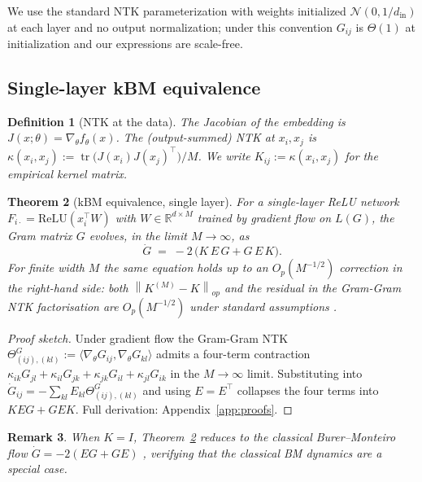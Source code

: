 \documentclass{article}
\newtheorem{theorem}{Theorem}
\newtheorem{definition}[theorem]{Definition}
\newtheorem{remark}[theorem]{Remark}
\newcommand{\norm}[1]{\left\|#1\right\|}
\newcommand{\R}{\mathbb{R}}
\newcommand{\tr}{\operatorname{tr}}
\newcommand{\E}{E}
\begin{document}
We use the standard NTK parameterization with weights initialized
$\mathcal{N}(0, 1/d_{\text{in}})$ at each layer and no output normalization;
under this convention $G_{ij}$ is $\Theta(1)$ at initialization and our
expressions are scale-free.

\subsection{Single-layer kBM equivalence}

\begin{definition}[NTK at the data]
The Jacobian of the embedding is $J(x; \theta) = \nabla_\theta f_\theta(x)$.
The (output-summed) NTK at $x_i, x_j$ is
$\kappa(x_i, x_j) := \tr\!\bigl(J(x_i)J(x_j)^\top\bigr)/M$.
We write $K_{ij} := \kappa(x_i, x_j)$ for the empirical kernel matrix.
\end{definition}

\begin{theorem}[kBM equivalence, single layer]
\label{thm:kbm}
For a single-layer ReLU network $F_{i\cdot} = \mathrm{ReLU}(x_i^\top W)$
with $W \in \R^{d \times M}$ trained by gradient flow on $L(G)$, the Gram
matrix $G$ evolves, in the limit $M \to \infty$, as
\[
\dot{G} \;=\; -2\,\bigl(K\,\E\,G + G\,\E\,K\bigr).
\]
For finite width $M$ the same equation holds up to an
$O_p(M^{-1/2})$ correction in the right-hand side: both
$\norm{K^{(M)} - K}_{op}$ and the residual in the Gram-Gram NTK
factorisation are $O_p(M^{-1/2})$ under standard assumptions
\citep{jacot2018neural,lee2019wide,yang2020tensor}.
\end{theorem}

\begin{proof}[Proof sketch]
Under gradient flow the Gram-Gram NTK
$\Theta^G_{(ij),(kl)} := \langle \nabla_\theta G_{ij}, \nabla_\theta G_{kl}\rangle$
admits a four-term contraction
$\kappa_{ik}G_{jl} + \kappa_{il}G_{jk} + \kappa_{jk}G_{il} + \kappa_{jl}G_{ik}$
in the $M\to\infty$ limit. Substituting into
$\dot G_{ij} = -\sum_{kl}\E_{kl}\Theta^G_{(ij),(kl)}$ and using
$\E=\E^\top$ collapses the four terms into $KEG+GEK$. Full derivation:
Appendix~\ref{app:proofs}.
\end{proof}

\begin{remark}
When $K = I$, Theorem~\ref{thm:kbm} reduces to the classical
Burer--Monteiro flow $\dot G = -2(\E G + G \E)$ \citep{burer2003nonlinear},
verifying that the classical BM dynamics are a special case.
\end{remark}
\end{document}
